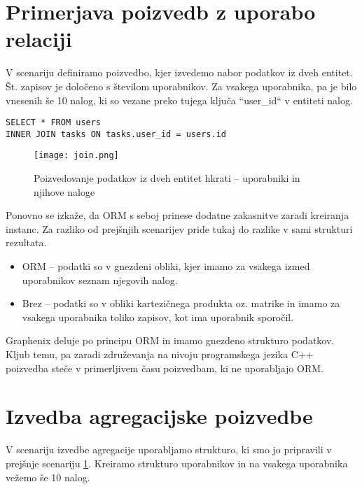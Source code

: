\documentclass[a4paper,12pt,openright]{book}
\begin{document}
    \newpage
    \section{Primerjava poizvedb z uporabo relaciji}
    \label{join_lbl}

    V scenariju definiramo poizvedbo, kjer izvedemo nabor podatkov iz dveh entitet. Št. zapisov je določeno s številom uporabnikov. Za vsakega uporabnika, pa je bilo vnesenih še 10 nalog, ki so vezane preko tujega ključa ``user\_id`` v entiteti nalog.
    
\begin{verbatim}
SELECT * FROM users 
INNER JOIN tasks ON tasks.user_id = users.id
\end{verbatim}

    \begin{figure}[H]
        \centerline{\texttt{[image: join.png]}}
        \caption{Poizvedovanje podatkov iz dveh entitet hkrati – uporabniki in njihove naloge}
        \label{join}
    \end{figure}

    \noindent
    Ponovno se izkaže, da ORM s seboj prinese dodatne zakasnitve zaradi kreiranja instanc. Za razliko od prejšnjih scenarijev pride tukaj do razlike v sami strukturi rezultata.
    
    \begin{itemize}
        \item ORM – podatki so v gnezdeni obliki, kjer imamo za vsakega izmed uporabnikov seznam njegovih nalog.
        \item Brez – podatki so v obliki kartezičnega produkta oz. matrike in imamo za vsakega uporabnika toliko zapisov, kot ima uporabnik sporočil.
    \end{itemize}

    \noindent
    Graphenix deluje po principu ORM in imamo gnezdeno strukturo podatkov. Kljub temu, pa zaradi združevanja na nivoju programskega jezika C++ poizvedba steče v primerljivem času poizvedbam, ki ne uporabljajo ORM.
    
    \section{Izvedba agregacijske poizvedbe}

    V scenariju izvedbe agregacije uporabljamo strukturo, ki smo jo pripravili v prejšnje scenariju \ref{join_lbl}. Kreiramo strukturo uporabnikov in na vsakega uporabnika vežemo še 10 nalog.
\end{document}
